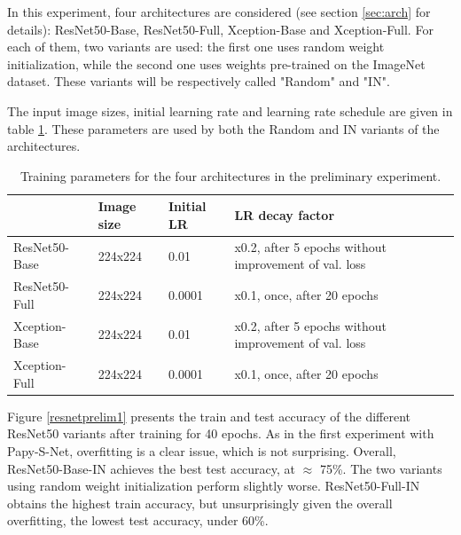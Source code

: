 \documentclass[11pt]{report}
\begin{document}
In this experiment, four architectures are considered (see section \ref{sec:arch} for details): ResNet50-Base, ResNet50-Full, Xception-Base and Xception-Full. For each of them, two variants are used: the first one uses random weight initialization, while the second one uses weights pre-trained on the ImageNet dataset. These variants will be respectively called "Random" and "IN".\newline

The input image sizes, initial learning rate and learning rate schedule are given in table \ref{prelimtable}. These parameters are used by both the Random and IN variants of the architectures.

\begin{table}[h!]
\begin{tabular}{l|l|l|l|}
\cline{2-4}
                                    & Image size & Initial LR & LR decay factor                                             \\ \hline
\multicolumn{1}{|l|}{ResNet50-Base} & 224x224    & 0.01                  & x0.2, after 5 epochs without improvement of val. loss \\ \hline
\multicolumn{1}{|l|}{ResNet50-Full} & 224x224    & 0.0001                & x0.1, once, after 20 epochs                                 \\ \hline
\multicolumn{1}{|l|}{Xception-Base} & 224x224    & 0.01                  & x0.2, after 5 epochs without improvement of val. loss \\ \hline
\multicolumn{1}{|l|}{Xception-Full} & 224x224    & 0.0001                & x0.1, once, after 20 epochs                                 \\ \hline
\end{tabular}
\caption{Training parameters for the four architectures in the preliminary experiment.}
\label{prelimtable}
\end{table}

Figure \ref{resnetprelim1} presents the train and test accuracy of the different ResNet50 variants after training for 40 epochs. As in the first experiment with Papy-S-Net, overfitting is a clear issue, which is not surprising. Overall, ResNet50-Base-IN achieves the best test accuracy, at $\approx$ 75\%. The two variants using random weight initialization perform slightly worse.\newline
ResNet50-Full-IN obtains the highest train accuracy, but unsurprisingly given the overall overfitting, the lowest test accuracy, under 60\%.\newline
\end{document}
